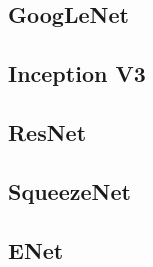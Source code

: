 \subsection{GoogLeNet}
\label{googlenet}

\subsection{Inception V3}
\label{inception}

\subsection{ResNet} %
\label{resnet}

\subsection{SqueezeNet}
\label{squeezenet}

\subsection{ENet}
\label{enet}
